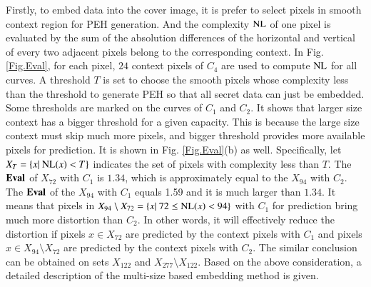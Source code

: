 \documentclass[review,3p,10pt,sort&compress]{elsarticle}
\begin{document}
Firstly, to embed data into the cover image, it is prefer to select pixels in smooth context region for PEH generation. And the complexity ${\rm NL}$ of one pixel is evaluated by the sum of the absolution differences of the horizontal and vertical of every two adjacent pixels belong to the corresponding context. In Fig. \ref{Fig.Eval}, for each pixel, $24$ context pixels of $C_4$ are used to compute ${\rm NL}$ for all curves.
A threshold $T$ is set to choose the smooth pixels whose complexity less than the threshold to generate PEH so that all secret data can just be embedded. Some thresholds are marked on the curves of $C_1$ and $C_2$. It shows that larger size context has a bigger threshold for a given capacity. This is because the large size context must skip much more pixels, and bigger threshold provides more available pixels for prediction. It is shown in Fig. \ref{Fig.Eval}(b) as well.
Specifically, let $X_{T} = \{x |\ {\rm NL}(x) < T\}$ indicates the set of pixels with complexity less than $T$. The ${\rm \mathbf{Eval}}$ of $X_{72}$ with $C_1$ is $1.34$, which is approximately equal to the $X_{94}$ with $C_2$. The ${\rm \mathbf{Eval}}$ of the $X_{94}$ with $C_1$ equals 1.59 and it is much larger than $1.34$. It means that pixels in $X_{94} \setminus X_{72} = \{x|\ 72 \leq {\rm NL}(x) < 94\}$ with $C_1$ for prediction bring much more distortion than $C_2$. In other words, it will effectively reduce the distortion if pixels $x \in X_{72}$ are predicted by the context pixels with $C_1$ and pixels $x \in X_{94} \setminus X_{72}$ are predicted by the context pixels with $C_2$. The similar conclusion can be obtained on sets $X_{122}$ and $X_{277} \setminus X_{122}$. Based on the above consideration, a detailed description of the multi-size based embedding method is given.
\end{document}
